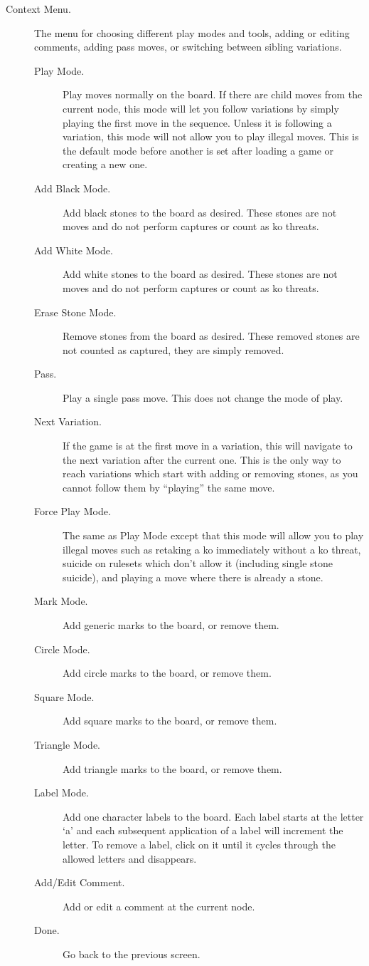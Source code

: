 \begin {description}
\item [Context Menu. ]
    The menu for choosing different play modes and tools, adding or editing
    comments, adding pass moves, or switching between sibling variations.
    \begin{description}
        \item[Play Mode.] Play moves normally on the board. If there are child
            moves from the current node, this mode will let you follow
            variations by simply playing the first move in the sequence.
            Unless it is following a variation, this mode will not allow you to
            play illegal moves. This is the default mode before another is set
            after loading a game or creating a new one.
        \item[Add Black Mode.] Add black stones to the board as desired. These
            stones are not moves and do not perform captures or count as ko threats.
        \item[Add White Mode.] Add white stones to the board as desired. These
            stones are not moves and do not perform captures or count as ko threats.
        \item[Erase Stone Mode.] Remove stones from the board as desired. These
            removed stones are not counted as captured, they are simply removed.
        \item[Pass.] Play a single pass move.  This does not change the mode of
            play.
        \item[Next Variation.] If the game is at the first move in a variation,
            this will navigate to the next variation after the current one. This
            is the only way to reach variations which start with adding or
            removing stones, as you cannot follow them by ``playing'' the same move.
        \item[Force Play Mode.] The same as Play Mode except that this mode will
            allow you to play illegal moves such as retaking a ko immediately
            without a ko threat, suicide on rulesets which don't allow it
            (including single stone suicide), and playing a move where there
            is already a stone.
        \item[Mark Mode.] Add generic marks to the board, or remove them.
        \item[Circle Mode.] Add circle marks to the board, or remove them.
        \item[Square Mode.] Add square marks to the board, or remove them.
        \item[Triangle Mode.] Add triangle marks to the board, or remove them.
        \item[Label Mode.] Add one character labels to the board. Each label
            starts at the letter `a' and each subsequent application of a label
            will increment the letter.  To remove a label, click on it until it
            cycles through the allowed letters and disappears.
        \item[Add/Edit Comment.] Add or edit a comment at the current node.
        \item[Done.] Go back to the previous screen.
    \end{description}
\end{description}
